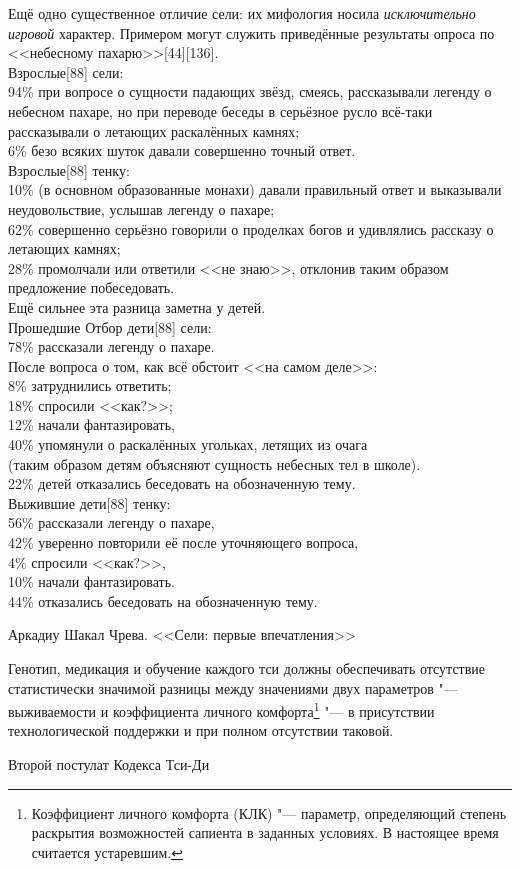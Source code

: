 \epigraph
{Ещё одно существенное отличие сели: их мифология носила \emph{исключительно игровой} характер.
Примером могут служить приведённые результаты опроса по <<небесному пахарю>>[44][136].\\
Взрослые[88] сели:\\
94\% при вопросе о сущности падающих звёзд, смеясь, рассказывали легенду о небесном пахаре, но при переводе беседы в серьёзное русло всё-таки рассказывали о летающих раскалённых камнях;\\
6\% безо всяких шуток давали совершенно точный ответ.\\
Взрослые[88] тенку:\\
10\% (в основном образованные монахи) давали правильный ответ и выказывали неудовольствие, услышав легенду о пахаре;\\
62\% совершенно серьёзно говорили о проделках богов и удивлялись рассказу о летающих камнях;\\
28\% промолчали или ответили <<не знаю>>, отклонив таким образом предложение побеседовать.\\
Ещё сильнее эта разница заметна у детей.\\
Прошедшие Отбор дети[88] сели:\\
78\% рассказали легенду о пахаре.\\
После вопроса о том, как всё обстоит <<на самом деле>>:\\
8\% затруднились ответить;\\
18\% спросили <<как?>>;\\
12\% начали фантазировать,\\
40\% упомянули о раскалённых угольках, летящих из очага\\
(таким образом детям объясняют сущность небесных тел в школе).\\
22\% детей отказались беседовать на обозначенную тему.\\
Выжившие дети[88] тенку:\\
56\% рассказали легенду о пахаре,\\
42\% уверенно повторили её после уточняющего вопроса,\\
4\% спросили <<как?>>,\\
10\% начали фантазировать.\\
44\% отказались беседовать на обозначенную тему.}
{Аркадиу Шакал Чрева.
<<Сели: первые впечатления>>}

\epigraph
{Генотип, медикация и обучение каждого тси должны обеспечивать отсутствие статистически значимой разницы между значениями двух параметров "--- выживаемости и коэффициента личного комфорта\footnote
{Коэффициент личного комфорта (КЛК) "--- параметр, определяющий степень раскрытия возможностей сапиента в заданных условиях.
В настоящее время считается устаревшим. \authornote}
"--- в присутствии технологической поддержки и при полном отсутствии таковой.}
{Второй постулат Кодекса Тси-Ди}

